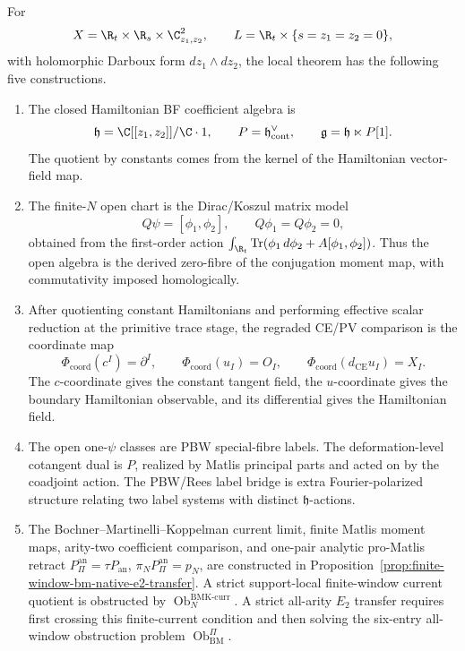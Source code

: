 \documentclass[11pt]{memoir}
\begin{document}
\begin{prop}\label{prop:native-darboux-disk-constructions}
  For
  \[
    X=\R_t\times\R_s\times\C^2_{z_1,z_2},\qquad
    L=\R_t\times\{s=z_1=z_2=0\},
  \]
  with holomorphic Darboux form \(dz_1\wedge dz_2\), the local theorem
  has the following five constructions.
  \begin{enumerate}
    \item The closed Hamiltonian BF coefficient algebra is
      \[
        \mathfrak h=\C[[z_1,z_2]]/\C\cdot1,\qquad
        P=\mathfrak h^\vee_{\mathrm{cont}},\qquad
        \mathfrak g=\mathfrak h\ltimes P[1].
      \]
      The quotient by constants comes from the kernel of the Hamiltonian
      vector-field map.
    \item The finite-\(N\) open chart is the Dirac/Koszul matrix model
      \[
        Q\psi=[\phi_1,\phi_2],\qquad Q\phi_1=Q\phi_2=0,
      \]
      obtained from the first-order action
      \(\int_{\R_t}\operatorname{Tr}(\phi_1\,d\phi_2
      +A[\phi_1,\phi_2])\).  Thus the open algebra is the derived
      zero-fibre of the conjugation moment map, with commutativity
      imposed homologically.
    \item After quotienting constant Hamiltonians and performing
      effective scalar reduction at the primitive trace stage, the
      regraded CE/PV comparison is the coordinate map
      \[
        \Phi_{\mathrm{coord}}(c^I)=\partial^I,\qquad
        \Phi_{\mathrm{coord}}(u_I)=O_I,\qquad
        \Phi_{\mathrm{coord}}(d_{\mathrm{CE}}u_I)=X_I .
      \]
      The \(c\)-coordinate gives the constant tangent field, the
      \(u\)-coordinate gives the boundary Hamiltonian observable, and
      its differential gives the Hamiltonian field.
    \item The open one-\(\psi\) classes are PBW special-fibre labels.
      The deformation-level cotangent dual is \(P\), realized by Matlis
      principal parts and acted on by the coadjoint action.  The
      PBW/Rees label bridge is extra Fourier-polarized structure
      relating two label systems with distinct \(\mathfrak h\)-actions.
    \item The Bochner--Martinelli--Koppelman current limit, finite
      Matlis moment maps, arity-two coefficient comparison, and
      one-pair analytic pro-Matlis retract
      \(P_{\Pi}^{\mathrm{an}}=\tau P_{\mathrm{an}}\),
      \(\pi_NP_{\Pi}^{\mathrm{an}}=p_N\), are constructed in
      Proposition~\ref{prop:finite-window-bm-native-e2-transfer}.  A
      strict support-local finite-window current quotient is obstructed
      by \(\operatorname{Ob}^{\mathrm{BMK\mbox{-}curr}}_N\).  A strict
      all-arity \(E_2\) transfer requires first crossing this
      finite-current condition and then
      solving the six-entry all-window obstruction problem
      \(\operatorname{Ob}^{\Pi}_{\mathrm{BM}}\).
  \end{enumerate}
\end{prop}
\end{document}
